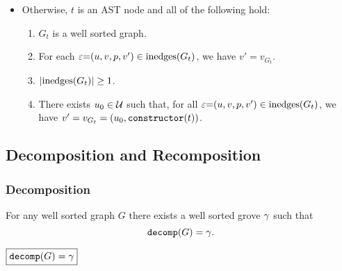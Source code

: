 \begin{definition}
\begin{itemize}
    \item Otherwise, $t$ is an AST node and all of the following hold:
      \begin{enumerate}
        \item $G_t$ is a well sorted graph.
        \item For each $\varepsilon{=}(u, v, p, v') \in \text{inedges}\mathopen{}\left(G_t\right)\mathclose{}$, we have $v' = v_{G_t}$.
        \item $\left\lvert\text{inedges}\mathopen{}\left(G_t\right)\mathclose{}\right\rvert \geq 1$.
        \item There exists $u_0 \in \mathcal{U}$ such that,
          for all $\varepsilon{=}(u, v, p, v') \in \text{inedges}\mathopen{}\left(G_t\right)\mathclose{}$,
          we have $v' = v_{G_t} = (u_0, \operatorname{\texttt{constructor}}\mathopen{}\left(t\right)\mathclose{})$.
      \end{enumerate}
  \end{itemize}
\end{definition}



\subsection{Decomposition and Recomposition}

\figureDecompositionDefHelpersContent


\subsubsection{Decomposition}

\begin{theorem}
  For any well sorted graph $G$
  there exists a well sorted grove $\gamma$
  such that \[\operatorname{\texttt{decomp}}\mathopen{}\left(G\right)\mathclose{} = \gamma.\]
\end{theorem}


\noindent $\boxed{\operatorname{\texttt{decomp}}\mathopen{}\left(G\right)\mathclose{} = \gamma}$
%
\figureDecompositionDefDecomp

